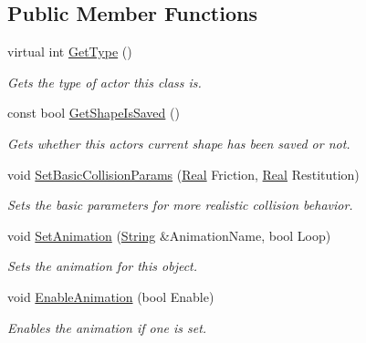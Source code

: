 \subsection*{Public Member Functions}
\begin{DoxyCompactItemize}
\item 
virtual int \hyperlink{classphys_1_1ActorBase_ab8bedea2ef0ce9194731ebeb886333ff}{GetType} ()
\begin{DoxyCompactList}\small\item\em Gets the type of actor this class is. \item\end{DoxyCompactList}\item 
const bool \hyperlink{classphys_1_1ActorBase_ace1d04b4fbb21823cde3feee83d17c2f}{GetShapeIsSaved} ()
\begin{DoxyCompactList}\small\item\em Gets whether this actors current shape has been saved or not. \item\end{DoxyCompactList}\item 
void \hyperlink{classphys_1_1ActorBase_ac60e1ebd1a08882234a6d04aff745260}{SetBasicCollisionParams} (\hyperlink{namespacephys_af7eb897198d265b8e868f45240230d5f}{Real} Friction, \hyperlink{namespacephys_af7eb897198d265b8e868f45240230d5f}{Real} Restitution)
\begin{DoxyCompactList}\small\item\em Sets the basic parameters for more realistic collision behavior. \item\end{DoxyCompactList}\item 
void \hyperlink{classphys_1_1ActorBase_a708ec161f50833323294aa7ddceee776}{SetAnimation} (\hyperlink{namespacephys_aa03900411993de7fbfec4789bc1d392e}{String} \&AnimationName, bool Loop)
\begin{DoxyCompactList}\small\item\em Sets the animation for this object. \item\end{DoxyCompactList}\item 
void \hyperlink{classphys_1_1ActorBase_a72203a9c7befd1ab606ff69af4183849}{EnableAnimation} (bool Enable)
\begin{DoxyCompactList}\small\item\em Enables the animation if one is set. \item\end{DoxyCompactList}\item 

\end{DoxyCompactItemize}
